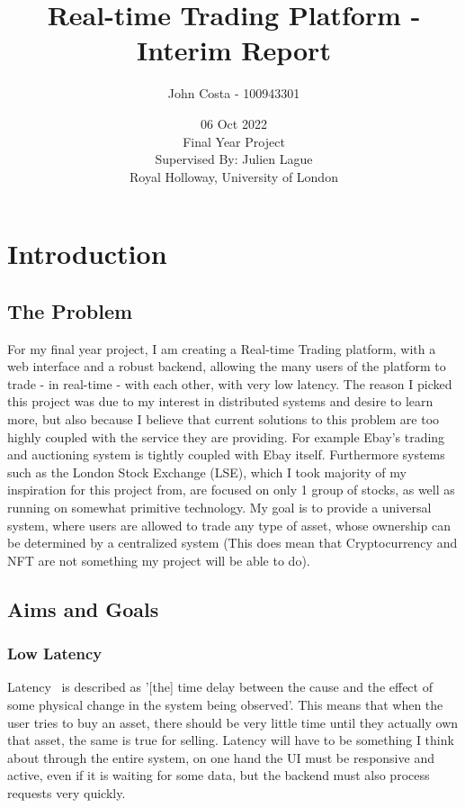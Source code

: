 \documentclass[titlepage]{article}
\title{Real-time Trading Platform - Interim Report}
\author{John Costa - 100943301}
\date{06 Oct 2022 \\
  \Large{Final Year Project \\
Supervised By: Julien Lague \\
Royal Holloway, University of London}}
\begin{document}
\maketitle

\tableofcontents
\newpage

\section{Introduction}
\subsection{The Problem}
For my final year project, I am creating a Real-time Trading platform, with a web interface and a robust backend, allowing the many users of the platform to trade - in real-time - with each other, with very low latency. The reason I picked this project was due to my interest in distributed systems and desire to learn more, but also because I believe that current solutions to this problem are too highly coupled with the service they are providing. For example Ebay's trading and auctioning system is tightly coupled with Ebay itself. Furthermore systems such as the London Stock Exchange (LSE), which I took majority of my inspiration for this project from, are focused on only 1 group of stocks, as well as running on somewhat primitive technology. My goal is to provide a universal system, where users are allowed to trade any type of asset, whose ownership can be determined by a centralized system (This does mean that Cryptocurrency and NFT are not something my project will be able to do).

\subsection{Aims and Goals}

\subsubsection{Low Latency}
Latency~\cite{latency} is described as '[the] time delay between the cause and the effect of some physical change in the system being observed'. This means that when the user tries to buy an asset, there should be very little time until they actually own that asset, the same is true for selling. Latency will have to be something I think about through the entire system, on one hand the UI must be responsive and active, even if it is waiting for some data, but the backend must also process requests very quickly.
\end{document}
